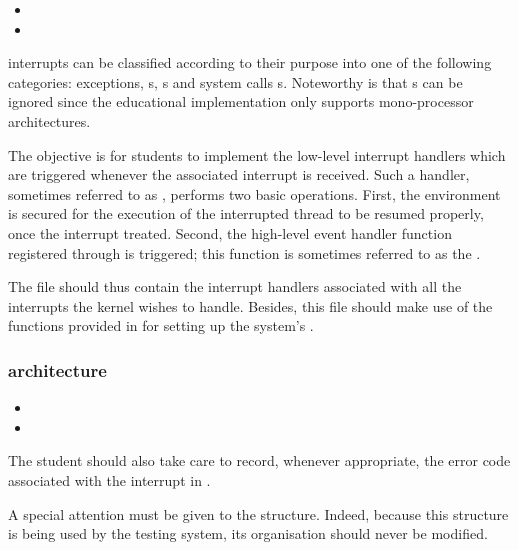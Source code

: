 \begin{itemize}
  \item
  \item
\end{itemize}

 interrupts can be classified according to their purpose into
one of the following categories: exceptions, s,
s and system calls \aka{}
s. Noteworthy is that s can be ignored since the
educational implementation only supports mono-processor architectures.

The objective is for students to implement the low-level interrupt handlers
which are triggered whenever the associated interrupt is received. Such a
handler, sometimes referred to as , performs two basic
operations. First, the environment is secured for the execution of the
interrupted thread to be resumed properly, once the interrupt treated.
Second, the high-level event handler function registered through
 is triggered; this function is sometimes referred
to as the .

The file  should thus contain the interrupt handlers
associated with all the interrupts the kernel wishes to handle. Besides,
this file should make use of the functions provided in 
for setting up the system's .

\subsubsection*{architecture}

\begin{itemize}
  \item
  \item
\end{itemize}

The student should also take care to record, whenever appropriate, the
error code associated with the interrupt in .

A special attention must be given to the  structure.
Indeed, because this structure is being used by the testing system, its
organisation should never be modified.

